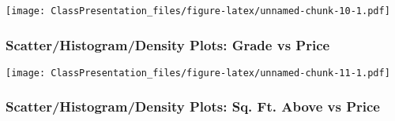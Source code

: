 \documentclass[]{article}
\newenvironment{Shaded}{\begin{snugshade}}{\end{snugshade}}
\newcommand{\DataTypeTok}[1]{\textcolor[rgb]{0.13,0.29,0.53}{#1}}
\newcommand{\KeywordTok}[1]{\textcolor[rgb]{0.13,0.29,0.53}{\textbf{#1}}}
\newcommand{\NormalTok}[1]{#1}
\newcommand{\OperatorTok}[1]{\textcolor[rgb]{0.81,0.36,0.00}{\textbf{#1}}}
\newcommand{\StringTok}[1]{\textcolor[rgb]{0.31,0.60,0.02}{#1}}
\begin{document}
\begin{Shaded}
\end{Shaded}

\texttt{[image: ClassPresentation\_files/figure-latex/unnamed-chunk-10-1.pdf]}

\hypertarget{scatterhistogramdensity-plots-grade-vs-price}{%
\subsubsection{Scatter/Histogram/Density Plots: Grade vs
Price}\label{scatterhistogramdensity-plots-grade-vs-price}}

\begin{Shaded}
\end{Shaded}

\texttt{[image: ClassPresentation\_files/figure-latex/unnamed-chunk-11-1.pdf]}

\hypertarget{scatterhistogramdensity-plots-sq.-ft.-above-vs-price}{%
\subsubsection{Scatter/Histogram/Density Plots: Sq. Ft. Above vs
Price}\label{scatterhistogramdensity-plots-sq.-ft.-above-vs-price}}

\begin{Shaded}
\end{Shaded}
\end{document}
